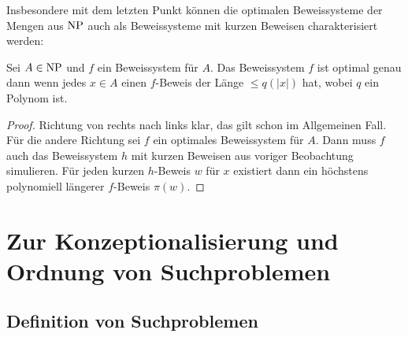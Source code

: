 Insbesondere mit dem letzten Punkt können die optimalen Beweissysteme der Mengen aus $\mathrm{NP}$ auch als Beweissysteme mit kurzen Beweisen charakterisiert werden:
\begin{observation}
    Sei $A\in\mathrm{NP}$ und $f$ ein Beweissystem für $A$. Das Beweissystem $f$ ist optimal genau dann wenn jedes $x\in A$ einen $f$-Beweis der Länge $\leq q(|x|)$ hat, wobei $q$ ein Polynom ist.
\end{observation}
\begin{proof}
    Richtung von rechts nach links klar, das gilt schon im Allgemeinen Fall. Für die andere Richtung sei $f$ ein optimales Beweissystem für $A$. Dann muss $f$ auch das Beweissystem $h$ mit kurzen Beweisen aus voriger Beobachtung simulieren. Für jeden kurzen $h$-Beweis $w$ für $x$ existiert dann ein höchstens polynomiell längerer $f$-Beweis $\pi(w)$.
\end{proof}



\chapter{Zur Konzeptionalisierung und Ordnung von Suchproblemen}


\section{Definition von Suchproblemen}

